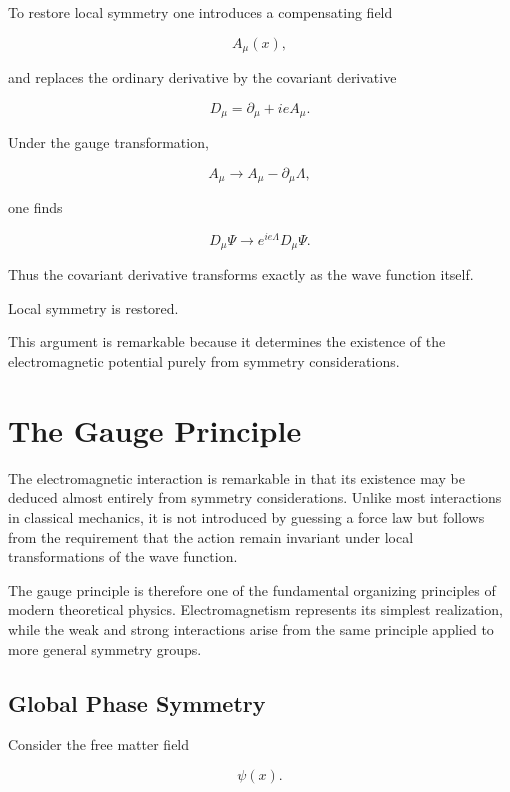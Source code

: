 To restore local symmetry one introduces a compensating field

\[
A_\mu(x),
\]

and replaces the ordinary derivative by the covariant derivative

\[
\boxed{
D_\mu
=
\partial_\mu
+
ieA_\mu.
}
\]

Under the gauge transformation,

\[
\boxed{
A_\mu
\rightarrow
A_\mu
-
\partial_\mu\Lambda,
}
\]

one finds

\[
D_\mu\Psi
\rightarrow
e^{ie\Lambda}
D_\mu\Psi.
\]

Thus the covariant derivative transforms exactly as the wave function
itself.

Local symmetry is restored.

This argument is remarkable because it determines the existence of the
electromagnetic potential purely from symmetry considerations.



\section{The Gauge Principle}

The electromagnetic interaction is remarkable in that its existence may
be deduced almost entirely from symmetry considerations. Unlike most
interactions in classical mechanics, it is not introduced by guessing a
force law but follows from the requirement that the action remain
invariant under local transformations of the wave function.

The gauge principle is therefore one of the fundamental organizing
principles of modern theoretical physics. Electromagnetism represents
its simplest realization, while the weak and strong interactions arise
from the same principle applied to more general symmetry groups.


\subsection{Global Phase Symmetry}

Consider the free matter field

\[
\psi(x).
\]

